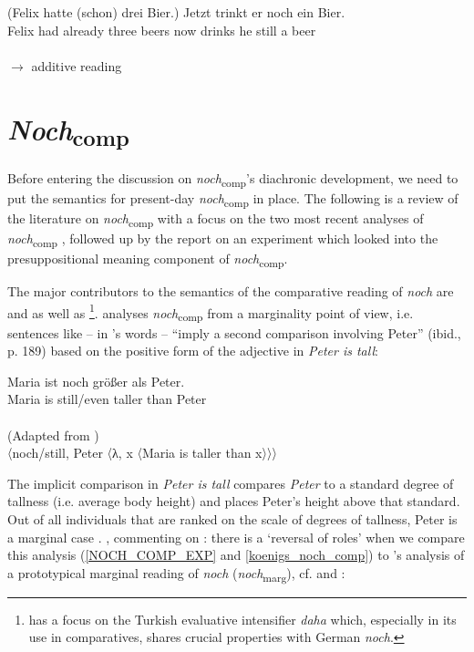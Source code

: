 \documentclass[output=paper]{langsci/langscibook}
\begin{document}
\ea\gll (Felix hatte (schon) drei Bier.) Jetzt trinkt er noch ein Bier.\\
       Felix had already three beers now drinks he still a beer\\
 \\ \hfill $\rightarrow$ additive reading \label{NOCH_ADD_EXP}
\z

\section{\textit{Noch}\textsubscript{comp}}\label{sec_noch-comp_gen}

Before entering the discussion on \textit{noch}\textsubscript{comp}'s diachronic development, we need to put the semantics for present-day \textit{noch}\textsubscript{comp} in place. The following is a review of the literature on \textit{noch}\textsubscript{comp} with a focus on the two most recent analyses of \textit{noch}\textsubscript{comp} \citep{umbach2009a_comp,Hofstetter2013}, followed up by the report on an experiment which looked into the presuppositional meaning component of \textit{noch}\textsubscript{comp}.

The major contributors to the semantics of the comparative reading of \textit{noch} are \citet{koenig1977} and \citet{umbach2009a_comp} as well as \citet{Hofstetter2013}\footnote{ \citet{Hofstetter2013} has a focus on the Turkish evaluative intensifier \textit{daha} which, especially in its use in comparatives, shares crucial properties with German \textit{noch}.}. \citet{koenig1977} analyses \textit{noch}\textsubscript{comp} from a marginality point of view, i.e. sentences like  -- in \citeauthor{koenig1977}'s words -- ``imply a second comparison involving Peter'' (ibid., p. 189) based on the positive form of the adjective in \textit{Peter is tall}:

\ea\gll Maria ist noch größer als Peter.\\
       Maria is still/even taller than Peter\\
 \label{NOCH_COMP_EXP}\\
\ex (Adapted from \citealt[ex. 49']{koenig1977}) \\
    〈{noch}/{still}, Peter 〈λ, x 〈Maria is taller than x〉〉〉 \label{koenigs_noch_comp} 
\z\largerpage

The implicit comparison in \textit{Peter is tall} compares \textit{Peter} to a standard degree of tallness (i.e. average body height) and places Peter's height above that standard. Out of all individuals that are ranked on the scale of degrees of tallness, Peter is a marginal case \citep{koenig1977}. \citet{umbach2009a_comp}, commenting on \citealt{koenig1977}: there is a `reversal of roles' when we compare this analysis (\ref{NOCH_COMP_EXP} and \ref{koenigs_noch_comp}) to \citeauthor{koenig1977}'s analysis of a prototypical marginal reading of \textit{noch} (\textit{noch}\textsubscript{marg}), cf.  and :
\end{document}
